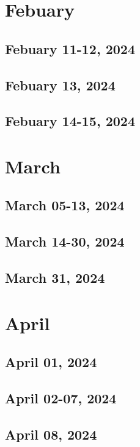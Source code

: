 \chapter{Febuary}
\section{Febuary 11-12, 2024}

\section{Febuary 13, 2024}

\section{Febuary 14-15, 2024}


\chapter{March}
\section{March 05-13, 2024}

\section{March 14-30, 2024}

\section{March 31, 2024}


\chapter{April}
\section{April 01, 2024}

\section{April 02-07, 2024}

\section{April 08, 2024}


